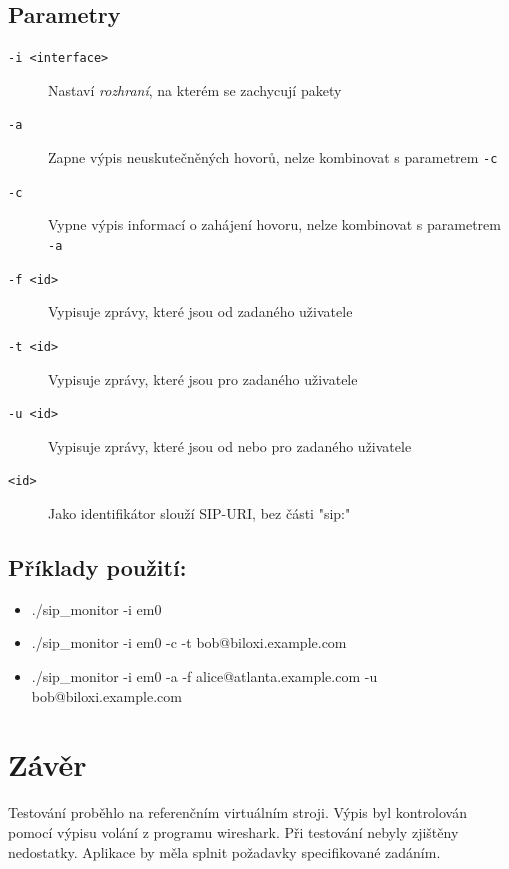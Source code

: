 \documentclass[11pt,a4paper]{article}
\begin{document}
\subsection*{Parametry}
\begin{description}
  \item[\tt -i \textless interface\textgreater] Nastaví \emph{rozhraní}, na kterém se zachycují pakety
  \item[\tt -a] Zapne výpis neuskutečněných hovorů, nelze kombinovat s parametrem \texttt{-c}
  \item[\tt -c] Vypne výpis informací o zahájení hovoru, nelze kombinovat s parametrem \texttt{-a}
  \item[\tt -f \textless id\textgreater] Vypisuje zprávy, které jsou od zadaného uživatele
  \item[\tt -t \textless id\textgreater] Vypisuje zprávy, které jsou pro zadaného uživatele
  \item[\tt -u \textless id\textgreater] Vypisuje zprávy, které jsou od nebo pro zadaného uživatele
  \item[\tt \textless id\textgreater] Jako identifikátor slouží SIP-URI, bez části "sip:"
\end{description}
\subsection*{Příklady použití:}
\begin{itemize}
  \item ./sip\_monitor -i em0
  \item ./sip\_monitor -i em0 -c -t bob@biloxi.example.com
  \item ./sip\_monitor -i em0 -a -f alice@atlanta.example.com -u bob@biloxi.example.com
\end{itemize}

\section{Závěr}
Testování proběhlo na referenčním virtuálním stroji. Výpis byl kontrolován
pomocí výpisu volání z programu wireshark. Při testování nebyly zjištěny 
nedostatky. Aplikace by měla splnit požadavky specifikované zadáním.

\newpage

\renewcommand{\refname}{Použité zdroje}

\end{document}

